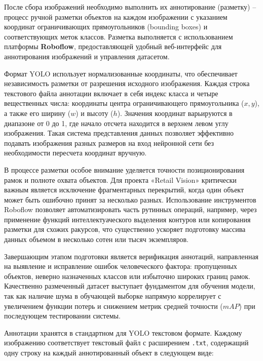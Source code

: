 {\gostFont

  \par \redline После сбора изображений необходимо выполнить их аннотирование (разметку) {--} процесс ручной разметки объектов на каждом изображении с указанием координат ограничивающих прямоугольников (bounding boxes) и соответствующих меток классов. Разметка выполняется с использованием платформы \textbf{Roboflow}, предоставляющей удобный веб-интерфейс для аннотирования изображений и управления датасетом.
  \par \redline Формат YOLO использует нормализованные координаты, что обеспечивает независимость разметки от разрешения исходного изображения. Каждая строка текстового файла аннотации включает в себя индекс класса и четыре вещественных числа: координаты центра ограничивающего прямоугольника ($x, y$), а также его ширину ($w$) и высоту ($h$). Значения координат варьируются в диапазоне от 0 до 1, где начало отсчета находится в верхнем левом углу изображения. Такая система представления данных позволяет эффективно подавать изображения разных размеров на вход нейронной сети без необходимости пересчета координат вручную.

  \par \redline В процессе разметки особое внимание уделяется точности позиционирования рамок и полноте охвата объектов. Для проекта «Retail Vision» критически важным является исключение фрагментарных перекрытий, когда один объект может быть ошибочно принят за несколько разных. Использование инструментов Roboflow позволяет автоматизировать часть рутинных операций, например, через применение функций интеллектуаческого выделения контуров или копирования разметки для схожих ракурсов, что существенно ускоряет подготовку массива данных объемом в несколько сотен или тысяч экземпляров.

  \par \redline Завершающим этапом подготовки является верификация аннотаций, направленная на выявление и исправление ошибок человеческого фактора: пропущенных объектов, неверно назначенных классов или избыточно широких границ рамок. Качественно размеченный датасет выступает фундаментом для обучения модели, так как наличие шума в обучающей выборке напрямую коррелирует с увеличением функции потерь и снижением метрик средней точности ($mAP$) при последующем тестировании системы.
  \par \redline Аннотации хранятся в стандартном для YOLO текстовом формате. Каждому изображению соответствует текстовый файл с расширением \texttt{.txt}, содержащий одну строку на каждый аннотированный объект в следующем виде:

}
